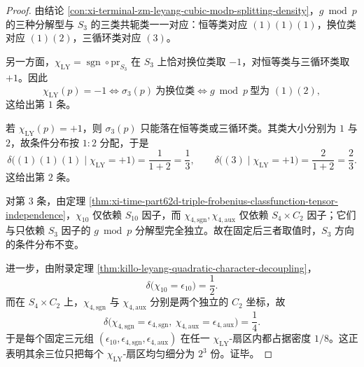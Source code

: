 \begin{proof}
由结论 \ref{con:xi-terminal-zm-leyang-cubic-modp-splitting-density}，\(g\bmod p\) 的三种分解型与 \(S_3\) 的三类共轭类一一对应：恒等类对应 \((1)(1)(1)\)，换位类对应 \((1)(2)\)，三循环类对应 \((3)\)。

另一方面，\(\chi_{\mathrm{LY}}=\operatorname{sgn}\circ\mathrm{pr}_{S_3}\) 在 \(S_3\) 上恰对换位类取 \(-1\)，对恒等类与三循环类取 \(+1\)。因此
\[
\chi_{\mathrm{LY}}(p)=-1
\iff
\sigma_3(p)\ \text{为换位类}
\iff
g\bmod p\ \text{型为 }(1)(2),
\]
这给出第 \(1\) 条。

若 \(\chi_{\mathrm{LY}}(p)=+1\)，则 \(\sigma_3(p)\) 只能落在恒等类或三循环类。其类大小分别为 \(1\) 与 \(2\)，故条件分布按 \(1:2\) 分配，于是
\[
\delta\!\bigl((1)(1)(1)\mid \chi_{\mathrm{LY}}=+1\bigr)=\frac{1}{1+2}=\frac13,
\qquad
\delta\!\bigl((3)\mid \chi_{\mathrm{LY}}=+1\bigr)=\frac{2}{1+2}=\frac23.
\]
这给出第 \(2\) 条。

对第 \(3\) 条，由定理 \ref{thm:xi-time-part62d-triple-frobenius-classfunction-tensor-independence}，\(\chi_{10}\) 仅依赖 \(S_{10}\) 因子，而 \(\chi_{4,\mathrm{sgn}},\chi_{4,\mathrm{aux}}\) 仅依赖 \(S_4\times C_2\) 因子；它们与只依赖 \(S_3\) 因子的 \(g\bmod p\) 分解型完全独立。故在固定后三者取值时，\(S_3\) 方向的条件分布不变。

进一步，由附录定理 \ref{thm:killo-leyang-quadratic-character-decoupling}，
\[
\delta\!\bigl(\chi_{10}=\epsilon_{10}\bigr)=\frac12.
\]
而在 \(S_4\times C_2\) 上，\(\chi_{4,\mathrm{sgn}}\) 与 \(\chi_{4,\mathrm{aux}}\) 分别是两个独立的 \(C_2\) 坐标，故
\[
\delta\!\bigl(\chi_{4,\mathrm{sgn}}=\epsilon_{4,\mathrm{sgn}},\ \chi_{4,\mathrm{aux}}=\epsilon_{4,\mathrm{aux}}\bigr)=\frac14.
\]
于是每个固定三元组 \((\epsilon_{10},\epsilon_{4,\mathrm{sgn}},\epsilon_{4,\mathrm{aux}})\) 在任一 \(\chi_{\mathrm{LY}}\)-扇区内都占据密度 \(1/8\)。这正表明其余三位只把每个 \(\chi_{\mathrm{LY}}\)-扇区均匀细分为 \(2^3\) 份。证毕。
\end{proof}

